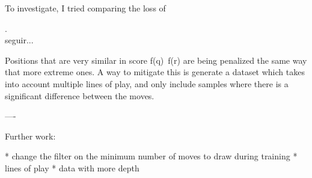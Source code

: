 To investigate, I tried comparing the loss of 

. \\

seguir...

Positions that are very similar in score f(q)~f(r) are being penalized the same way that more extreme ones. A way to mitigate this is generate a dataset which takes into account multiple lines of play, and only include samples where there is a significant difference between the moves.


----

Further work:

* change the filter on the minimum number of moves to draw during training
* lines of play
* data with more depth
